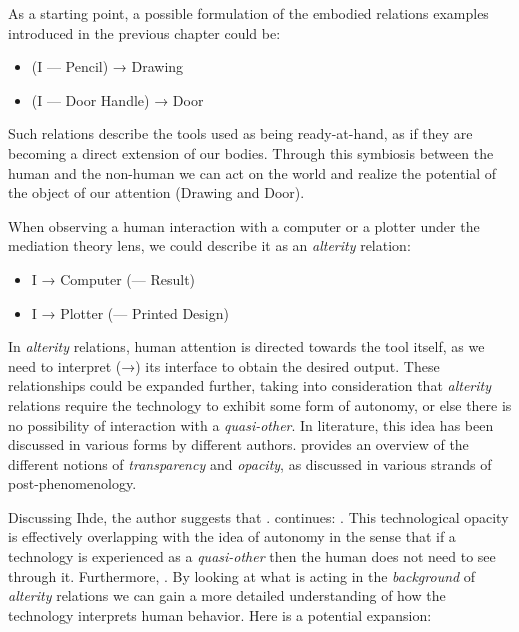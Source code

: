As a starting point, a possible formulation of the embodied relations examples introduced in the previous chapter could be:

\begin{itemize}
	\singlespacing
	\item (I --- Pencil) → Drawing
	\item (I --- Door Handle) → Door
\end{itemize}

Such relations describe the tools used as being ready-at-hand, as if they are becoming a direct extension of our bodies. Through this symbiosis between the human and the non-human we can act on the world and realize the potential of the object of our attention (Drawing and Door).

When observing a human interaction with a computer or a plotter under the mediation theory lens, we could describe it as an \emph{alterity} relation:

\begin{itemize}
	\singlespacing
	\item I → Computer (--- Result)
	\item I → Plotter (--- Printed Design)
\end{itemize}

In \emph{alterity} relations, human attention is directed towards the tool itself, as we need to interpret (→) its interface to obtain the desired output. These relationships could be expanded further, taking into consideration that \emph{alterity} relations require the technology to exhibit some form of autonomy, or else there is no possibility of interaction with a \emph{quasi-other}. In literature, this idea has been discussed in various forms by different authors. \cite{Eede2010} provides an overview of the different notions of \emph{transparency} and \emph{opacity}, as discussed in various strands of post-phenomenology.

Discussing Ihde, the author suggests that . \citeauthor{Eede2010} continues: . This technological opacity is effectively overlapping with the idea of autonomy in the sense that if a technology is experienced as a \emph{quasi-other} then the human does not need to see through it. Furthermore, .
By looking at what is acting in the \emph{background} of \emph{alterity} relations we can gain a more detailed understanding of how the technology interprets human behavior. Here is a potential expansion:

